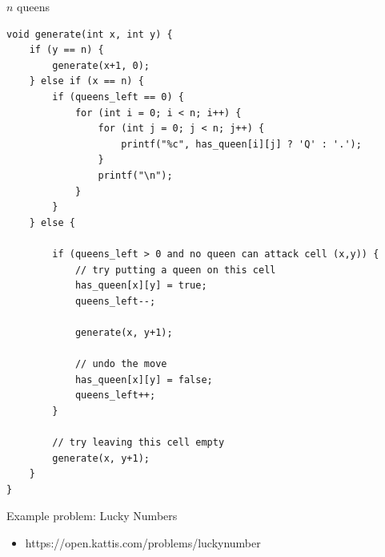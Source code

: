 \documentclass{beamer}
\begin{document}
\begin{frame}{$n$ queens}
    \begin{verbatim}
void generate(int x, int y) {
    if (y == n) {
        generate(x+1, 0);
    } else if (x == n) {
        if (queens_left == 0) {
            for (int i = 0; i < n; i++) {
                for (int j = 0; j < n; j++) {
                    printf("%c", has_queen[i][j] ? 'Q' : '.');
                }
                printf("\n");
            }
        }
    } else {

        if (queens_left > 0 and no queen can attack cell (x,y)) {
            // try putting a queen on this cell
            has_queen[x][y] = true;
            queens_left--;

            generate(x, y+1);

            // undo the move
            has_queen[x][y] = false;
            queens_left++;
        }

        // try leaving this cell empty
        generate(x, y+1);
    }
}
    \end{verbatim}
\end{frame}

\begin{frame}[plain]{Example problem: Lucky Numbers}
    \begin{itemize}
        \item https://open.kattis.com/problems/luckynumber
    \end{itemize}
\end{frame}
\end{document}

